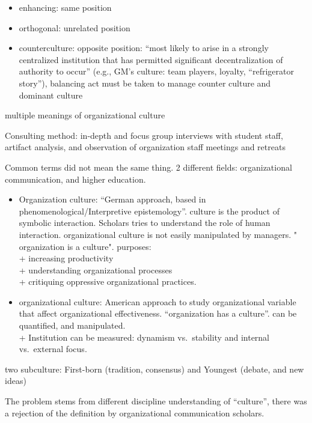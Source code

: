 \documentclass[
]{book}
\providecommand{\tightlist}{%
  \setlength{\itemsep}{0pt}\setlength{\parskip}{0pt}}
\begin{document}
\begin{itemize}
\tightlist
\item
  enhancing: same position\\
\item
  orthogonal: unrelated position\\
\item
  counterculture: opposite position: ``most likely to arise in a strongly centralized institution that has permitted significant decentralization of authority to occur'' (e.g., GM's culture: team players, loyalty, ``refrigerator story''), balancing act must be taken to manage counter culture and dominant culture
\end{itemize}

\citep{Dixon_2009}
multiple meanings of organizational culture

Consulting method: in-depth and focus group interviews with student staff, artifact analysis, and observation of organization staff meetings and retreats

Common terms did not mean the same thing. 2 different fields: organizational communication, and higher education.

\begin{itemize}
\tightlist
\item
  Organization culture: ``German approach, based in phenomenological/Interpretive epistemology''. culture is the product of symbolic interaction. Scholars tries to understand the role of human interaction. organizational culture is not easily manipulated by managers. " organization is a culture". purposes:\\
  + increasing productivity\\
  + understanding organizational processes\\
  + critiquing oppressive organizational practices.
\item
  organizational culture: American approach to study organizational variable that affect organizational effectiveness. ``organization has a culture''. can be quantified, and manipulated.\\
  + Institution can be measured: dynamism vs.~stability and internal vs.~external focus.
\end{itemize}

two subculture: First-born (tradition, consensus) and Youngest (debate, and new ideas)

The problem stems from different discipline understanding of ``culture'', there was a rejection of the definition by organizational communication scholars.
\end{document}
